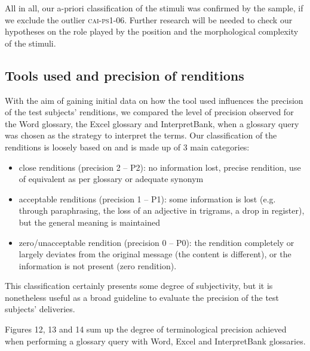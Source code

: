\documentclass[output=paper]{langsci/langscibook}
\begin{document}
All in all, our a-priori classification of the stimuli was confirmed by the sample, if we exclude the outlier \textsc{cai}-\textsc{ps1-06}. Further research will be needed to check our hypotheses on the role played by the position and the morphological complexity of the stimuli.

\subsection{Tools used and precision of renditions}\label{sec:prandi:5.2}

With the aim of gaining initial data on how the tool used influences the precision of the test subjects’ renditions, we compared the level of precision observed for the Word glossary, the Excel glossary and InterpretBank, when a glossary query was chosen as the strategy to interpret the terms. Our classification of the renditions is loosely based on \citet{Wadensjö1998} and is made up of 3 main categories:

\begin{itemize}
\item close renditions (precision 2 – P2): no information lost, precise rendition, use of equivalent as per glossary or adequate synonym
\item acceptable renditions (precision 1 – P1): some information is lost (e.g. through paraphrasing, the loss of an adjective in trigrams, a drop in register), but the general meaning is maintained
\item zero/unacceptable rendition (precision 0 – P0): the rendition completely or largely deviates from the original message (the content is different), or the information is not present (zero rendition).
\end{itemize}

This classification certainly presents some degree of subjectivity, but it is nonetheless useful as a broad guideline to evaluate the precision of the test subjects’ deliveries.

Figures 12, 13 and 14 sum up the degree of terminological precision achieved when performing a glossary query with Word, Excel and InterpretBank glossaries. 
\end{document}
